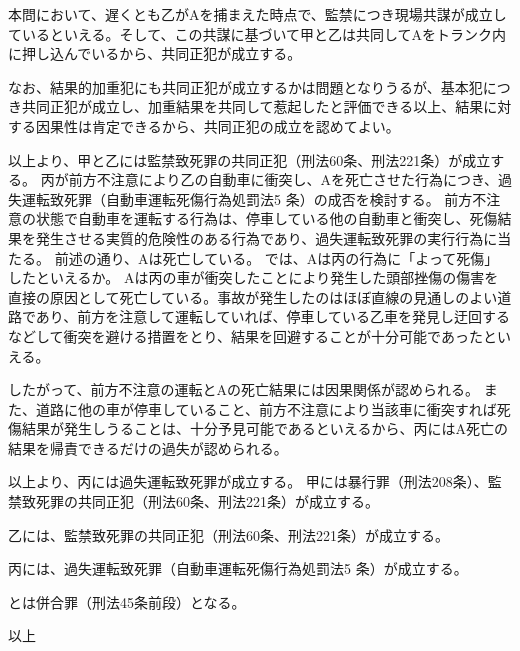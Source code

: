 \documentclass[11pt]{jsarticle}
\begin{document}
			本問において、遅くとも乙がAを捕まえた時点で、監禁につき現場共謀が成立しているといえる。そして、この共謀に基づいて甲と乙は共同してAをトランク内に押し込んでいるから、共同正犯が成立する。
			
			なお、結果的加重犯にも共同正犯が成立するかは問題となりうるが、基本犯につき共同正犯が成立し、加重結果を共同して惹起したと評価できる以上、結果に対する因果性は肯定できるから、共同正犯の成立を認めてよい。
			
			以上より、甲と乙には監禁致死罪の共同正犯（刑法60条、刑法221条）が成立する。
	丙が前方不注意により乙の自動車に衝突し、Aを死亡させた行為につき、過失運転致死罪（自動車運転死傷行為処罰法5 条）の成否を検討する。
	\sectionB{}
		前方不注意の状態で自動車を運転する行為は、停車している他の自動車と衝突し、死傷結果を発生させる実質的危険性のある行為であり、過失運転致死罪の実行行為に当たる。
	\sectionB{}
		前述の通り、Aは死亡している。
	\sectionB{}
		では、Aは丙の行為に「よって死傷」したといえるか。
		Aは丙の車が衝突したことにより発生した頭部挫傷の傷害を直接の原因として死亡している。事故が発生したのはほぼ直線の見通しのよい道路であり、前方を注意して運転していれば、停車している乙車を発見し迂回するなどして衝突を避ける措置をとり、結果を回避することが十分可能であったといえる。
		
		したがって、前方不注意の運転とAの死亡結果には因果関係が認められる。
	\sectionB{}
		また、道路に他の車が停車していること、前方不注意により当該車に衝突すれば死傷結果が発生しうることは、十分予見可能であるといえるから、丙にはA死亡の結果を帰責できるだけの過失が認められる。
		
		以上より、丙には過失運転致死罪が成立する。
	甲には暴行罪（刑法208条）、監禁致死罪の共同正犯（刑法60条、刑法221条）が成立する。
	
	乙には、監禁致死罪の共同正犯（刑法60条、刑法221条）が成立する。
	
	丙には、過失運転致死罪（自動車運転死傷行為処罰法5 条）が成立する。
	
	とは併合罪（刑法45条前段）となる。


\begin{flushright}	
	以上
\end{flushright}	
\end{document}
